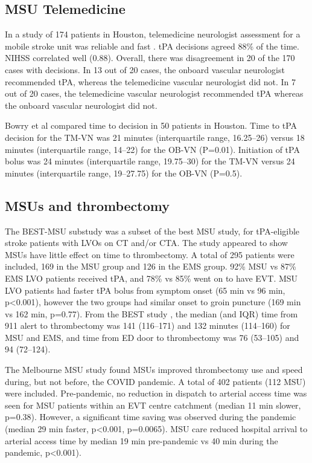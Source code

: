 \subsection{MSU Telemedicine}

In a study of 174 patients in Houston, telemedicine neurologist assessment for a mobile stroke unit was reliable and fast \cite{wu_telemedicine_2017} . tPA decisions agreed 88\% of the time. NIHSS correlated well (0.88). Overall, there was disagreement in 20 of the 170 cases with decisions. In 13 out of 20 cases, the onboard vascular neurologist recommended tPA, whereas the telemedicine vascular neurologist did not. In 7 out of 20 cases, the telemedicine vascular neurologist recommended tPA whereas the onboard vascular neurologist did not. 

Bowry et al \cite{bowry_time_2018} compared time to decision in 50 patients in Houston. Time to tPA decision for the TM-VN was 21 minutes (interquartile range, 16.25–26) versus 18 minutes (interquartile range, 14–22) for the OB-VN (P=0.01). Initiation of tPA bolus was 24 minutes (interquartile range, 19.75–30) for the TM-VN versus 24 minutes (interquartile range, 19–27.75) for the OB-VN (P=0.5).


\subsection{MSUs and thrombectomy}

The BEST-MSU substudy \cite{czap_abstract_2022} was a subset of the best MSU study, for tPA-eligible stroke patients with LVOs on CT and/or CTA. The study appeared to show MSUs have little effect on time to thrombectomy. A total of 295 patients were included, 169 in the MSU group and 126 in the EMS group. 92\% MSU vs 87\% EMS LVO patients received tPA, and 78\% vs 85\% went on to have EVT. MSU LVO patients had faster tPA bolus from symptom onset (65 min vs 96 min, p<0.001), however the two groups had similar onset to groin puncture (169 min vs 162 min, p=0.77). From the BEST study \cite{grotta_prospective_2021}, the median (and IQR) time from 911 alert to  thrombectomy was 141 (116–171) and 132 minutes (114–160) for MSU and EMS, and  time from ED door to thrombectomy was 76 (53–105) and 94 (72–124).


The Melbourne MSU study \cite{menezes_abstract_2023} found MSUs improved thrombectomy use and speed during, but not before, the COVID pandemic. A total of 402 patients (112 MSU) were included. Pre-pandemic, no reduction in dispatch to arterial access time was seen for MSU patients within an EVT centre catchment (median 11 min slower, p=0.38). However, a significant time saving was observed during the pandemic (median 29 min faster, p<0.001, p=0.0065). MSU care reduced hospital arrival to arterial access time by median 19 min pre-pandemic vs 40 min during the pandemic, p<0.001).

